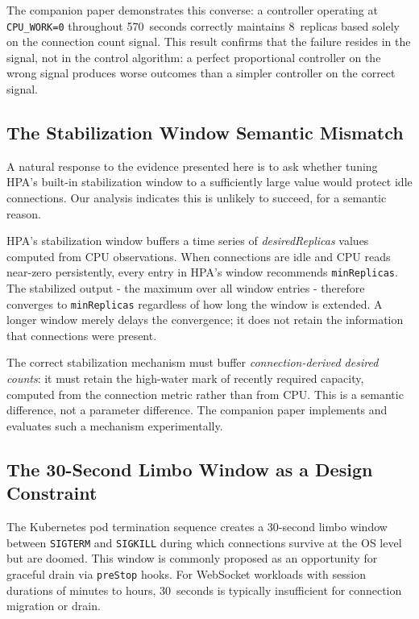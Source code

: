 \documentclass[twocolumn]{svjour3}
\begin{document}
The companion paper demonstrates this converse: a controller operating at \texttt{CPU\_WORK=0}
throughout 570~seconds correctly maintains 8~replicas based solely on the connection count
signal. This result confirms that the failure resides in the signal, not in the control
algorithm: a perfect proportional controller on the wrong signal produces worse outcomes than
a simpler controller on the correct signal.

\subsection{The Stabilization Window Semantic Mismatch}

A natural response to the evidence presented here is to ask whether tuning HPA's built-in
stabilization window to a sufficiently large value would protect idle connections. Our
analysis indicates this is unlikely to succeed, for a semantic reason.

HPA's stabilization window buffers a time series of \textit{desiredReplicas} values computed
from CPU observations. When connections are idle and CPU reads near-zero persistently, every
entry in HPA's window recommends \texttt{minReplicas}. The stabilized output - the maximum
over all window entries - therefore converges to \texttt{minReplicas} regardless of how long
the window is extended. A longer window merely delays the convergence; it does not retain
the information that connections
were present.

The correct stabilization mechanism must buffer \textit{connection-derived desired counts}:
it must retain the high-water mark of recently required capacity, computed from the connection
metric rather than from CPU. This is a semantic difference, not a parameter difference. The
companion paper implements and evaluates such a mechanism experimentally.

\subsection{The 30-Second Limbo Window as a Design Constraint}

The Kubernetes pod termination sequence creates a 30-second limbo window between
\texttt{SIGTERM} and \texttt{SIGKILL} during which connections survive at the OS level but
are doomed. This window is commonly proposed as an opportunity for graceful drain via
\texttt{preStop} hooks. For WebSocket workloads with session durations of minutes to hours,
30~seconds is typically insufficient for connection migration or drain.
\end{document}
